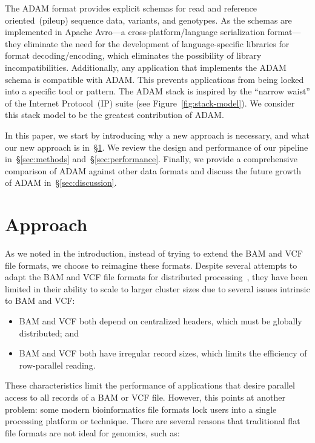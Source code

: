 \documentclass{bioinfo}
\begin{document}
The ADAM format provides explicit schemas for read and reference oriented~(pileup) sequence data, variants, and genotypes. As the
schemas are implemented in Apache Avro---a cross-platform/language serialization format---they eliminate
the need for the development of language-specific libraries for format decoding/encoding, which eliminates the possibility of library
incompatibilities. Additionally, any application that implements the ADAM schema is compatible with ADAM. This prevents
applications from being locked into a specific tool or pattern. The ADAM stack is inspired by the ``narrow waist'' of the Internet Protocol~(IP)
suite (see Figure~\ref{fig:stack-model}). We consider this stack model to be the greatest contribution of ADAM.

In this paper, we start by introducing why a new approach is necessary, and what our new approach is in~\S\ref{sec:approach}. We review the
design and performance of our pipeline in~\S\ref{sec:methods} and~\S\ref{sec:performance}. Finally, we provide a comprehensive comparison of
ADAM against other data formats and discuss the future growth of ADAM in~\S\ref{sec:discussion}.

\section{Approach}
\label{sec:approach}

As we noted in the introduction, instead of trying to extend the BAM and VCF file formats, we choose to reimagine these formats. Despite several attempts to adapt the
BAM and VCF file formats for distributed processing~\citep[see][]{niemenmaa12}, they have been limited in their ability to scale to larger cluster sizes due to several issues
intrinsic to BAM and VCF:

\begin{itemize}
\item BAM and VCF both depend on centralized headers, which must be globally distributed; and
\item BAM and VCF both have irregular record sizes, which limits the efficiency of row-parallel reading. 
\end{itemize}

These characteristics limit the performance of applications that desire parallel access to all records of a BAM or VCF file. However,
this points at another problem: some modern bioinformatics file formats lock users into a single processing platform or technique. There are
several reasons that traditional flat file formats are not ideal for genomics, such as:
\end{document}
